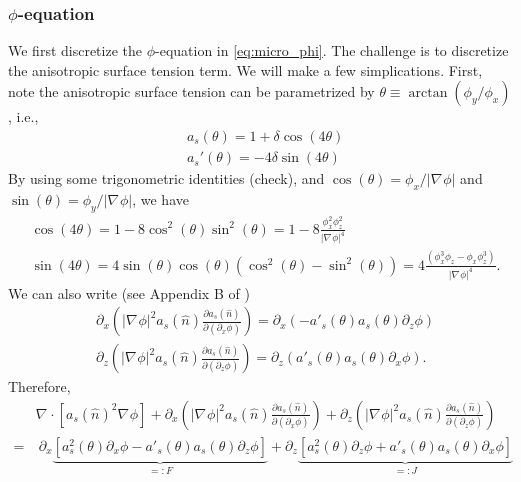\documentclass[a4paper,12pt]{article}
\renewcommand{\div}[1]{\nabla_{#1} \cdot}
\newcommand{\grad}[1]{\nabla_{#1}}
\begin{document}
\subsubsection{$\phi$-equation}
We first discretize the $\phi$-equation in \cref{eq:micro_phi}. The challenge is to discretize the anisotropic surface tension term. We will make a few simplications. First, note the anisotropic surface tension can be parametrized by $\theta \equiv \arctan(\phi_y / \phi_x)$, i.e., 
\begin{align}
& a_s(\theta)=  1 + \delta \cos(4 \theta) \\
& a_s'(\theta) = -4 \delta \sin(4\theta) 
\end{align}
By using some trigonometric identities (check), and $\cos(\theta) = \phi_x / |\grad{} \phi|$ and  $\sin(\theta) = \phi_y / |\grad{} \phi|$, we have
\begin{align}
& \cos(4\theta) = 1-8\cos^2(\theta) \sin^2(\theta) = 1- 8 \frac{ \phi_x^2 \phi_z^2 }{|\grad{} \phi|^4} \\
& \sin(4\theta) = 4 \sin(\theta) \cos(\theta) ( \cos^2(\theta) - \sin^2(\theta)) = 4 \frac{(\phi_x^3 \phi_z - \phi_x \phi_z^3 )}{|\grad{} \phi|^4}.
\end{align}
We can also write (see Appendix B of \cite{Tourret2015})
\begin{align}
& \partial_x \left( |\grad{} \phi|^2 a_s(\hat{n}) \frac{\partial a_s(\hat{n})}{\partial (\partial_x \phi)}  \right) = \partial_x (-a'_s(\theta) a_s(\theta) \partial_z \phi ) \\
& \partial_z \left( |\grad{} \phi|^2 a_s(\hat{n}) \frac{\partial a_s(\hat{n})}{\partial (\partial_z \phi)}  \right) = 
\partial_z (a'_s(\theta) a_s(\theta) \partial_x \phi).
\end{align}
Therefore,
\begin{align}
 & \div{} [a_s(\hat{n})^2 \grad{} \phi] +  \partial_x \left( |\grad{} \phi|^2 a_s(\hat{n}) \frac{\partial a_s(\hat{n})}{\partial (\partial_x \phi)}  \right)  +
\partial_z \left( |\grad{} \phi|^2 a_s(\hat{n}) \frac{\partial a_s(\hat{n})}{\partial (\partial_z \phi)}  \right) \nonumber \\
= &  \  \partial_x  \underbrace{ \left[ a_s^2(\theta) \partial_x \phi - a'_s(\theta) a_s(\theta) \partial_z \phi \right]}_{=: F} + 
\partial_z \underbrace{ \left[ a_s^2(\theta) \partial_z \phi + a'_s(\theta) a_s(\theta) \partial_x \phi \right]}_{=: J}  
\label{eq:aniso_surf2}
\end{align}
\end{document}
